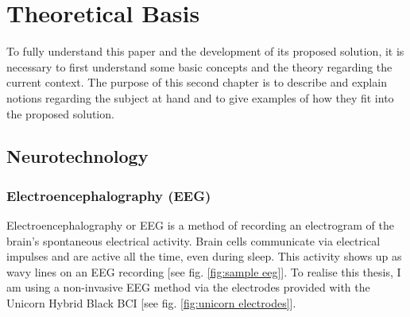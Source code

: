
\chapter{Theoretical Basis}\label{cap:theory}
To fully understand this paper and the development of its proposed solution, it is necessary to first understand some basic concepts and the theory regarding the current context. The purpose of this second chapter is to describe and explain notions regarding the subject at hand and to give examples of how they fit into the proposed solution.


\section{Neurotechnology}
\subsection{Electroencephalography (EEG)}
Electroencephalography or EEG is a method of recording an electrogram of the brain's spontaneous electrical activity. Brain cells communicate via electrical impulses and are active all the time, even during sleep\cite{EEG_mayoclinic}. This activity shows up as wavy lines on an EEG recording [see fig. \ref{fig:sample eeg}]. To realise this thesis, I am using a non-invasive EEG method via the electrodes provided with the Unicorn Hybrid Black BCI [see fig. \ref{fig:unicorn electrodes}].

